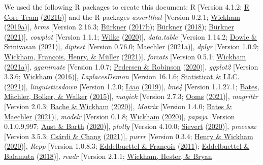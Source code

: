 \documentclass[
  11pt,
  english,
  man,floatsintext]{apa6}
\begin{document}
We used the following R packages to create this document: R {[}Version 4.1.2; \protect\hyperlink{ref-R-base}{R Core Team} (\protect\hyperlink{ref-R-base}{2021b}){]} and the R-packages \emph{assertthat} {[}Version 0.2.1; \protect\hyperlink{ref-R-assertthat}{Wickham} (\protect\hyperlink{ref-R-assertthat}{2019a}){]}, \emph{brms} {[}Version 2.16.3; \protect\hyperlink{ref-R-brms_a}{Bürkner} (\protect\hyperlink{ref-R-brms_a}{2017b}); \protect\hyperlink{ref-R-brms_b}{Bürkner} (\protect\hyperlink{ref-R-brms_b}{2018}); \protect\hyperlink{ref-R-brms_c}{Bürkner} (\protect\hyperlink{ref-R-brms_c}{2021}){]}, \emph{cowplot} {[}Version 1.1.1; \protect\hyperlink{ref-R-cowplot}{Wilke} (\protect\hyperlink{ref-R-cowplot}{2020}){]}, \emph{data.table} {[}Version 1.14.2; \protect\hyperlink{ref-R-data.table}{Dowle \& Srinivasan} (\protect\hyperlink{ref-R-data.table}{2021}){]}, \emph{diptest} {[}Version 0.76.0; \protect\hyperlink{ref-R-diptest}{Maechler} (\protect\hyperlink{ref-R-diptest}{2021a}){]}, \emph{dplyr} {[}Version 1.0.9; \protect\hyperlink{ref-R-dplyr}{Wickham, François, Henry, \& Müller} (\protect\hyperlink{ref-R-dplyr}{2021}){]}, \emph{forcats} {[}Version 0.5.1; \protect\hyperlink{ref-R-forcats}{Wickham} (\protect\hyperlink{ref-R-forcats}{2021a}){]}, \emph{gganimate} {[}Version 1.0.7; \protect\hyperlink{ref-R-gganimate}{Pedersen \& Robinson} (\protect\hyperlink{ref-R-gganimate}{2020}){]}, \emph{ggplot2} {[}Version 3.3.6; \protect\hyperlink{ref-R-ggplot2}{Wickham} (\protect\hyperlink{ref-R-ggplot2}{2016}){]}, \emph{LaplacesDemon} {[}Version 16.1.6; \protect\hyperlink{ref-R-LaplacesDemon}{Statisticat \& LLC.} (\protect\hyperlink{ref-R-LaplacesDemon}{2021}){]}, \emph{linguisticsdown} {[}Version 1.2.0; \protect\hyperlink{ref-R-linguisticsdown}{Liao} (\protect\hyperlink{ref-R-linguisticsdown}{2019}){]}, \emph{lme4} {[}Version 1.1.27.1; \protect\hyperlink{ref-R-lme4}{Bates, Mächler, Bolker, \& Walker} (\protect\hyperlink{ref-R-lme4}{2015}){]}, \emph{magick} {[}Version 2.7.3; \protect\hyperlink{ref-R-magick}{Ooms} (\protect\hyperlink{ref-R-magick}{2021}){]}, \emph{magrittr} {[}Version 2.0.3; \protect\hyperlink{ref-R-magrittr}{Bache \& Wickham} (\protect\hyperlink{ref-R-magrittr}{2020}){]}, \emph{Matrix} {[}Version 1.4.0; \protect\hyperlink{ref-R-Matrix}{Bates \& Maechler} (\protect\hyperlink{ref-R-Matrix}{2021}){]}, \emph{modelr} {[}Version 0.1.8; \protect\hyperlink{ref-R-modelr}{Wickham} (\protect\hyperlink{ref-R-modelr}{2020}){]}, \emph{papaja} {[}Version 0.1.0.9,997; \protect\hyperlink{ref-R-papaja}{Aust \& Barth} (\protect\hyperlink{ref-R-papaja}{2020}){]}, \emph{plotly} {[}Version 4.10.0; \protect\hyperlink{ref-R-plotly}{Sievert} (\protect\hyperlink{ref-R-plotly}{2020}){]}, \emph{processx} {[}Version 3.5.3; \protect\hyperlink{ref-R-processx}{Csárdi \& Chang} (\protect\hyperlink{ref-R-processx}{2021}){]}, \emph{purrr} {[}Version 0.3.4; \protect\hyperlink{ref-R-purrr}{Henry \& Wickham} (\protect\hyperlink{ref-R-purrr}{2020}){]}, \emph{Rcpp} {[}Version 1.0.8.3; \protect\hyperlink{ref-R-Rcpp_a}{Eddelbuettel \& François} (\protect\hyperlink{ref-R-Rcpp_a}{2011}); \protect\hyperlink{ref-R-Rcpp_b}{Eddelbuettel \& Balamuta} (\protect\hyperlink{ref-R-Rcpp_b}{2018}){]}, \emph{readr} {[}Version 2.1.1; \protect\hyperlink{ref-R-readr}{Wickham, Hester, \& Bryan} 
\end{document}
